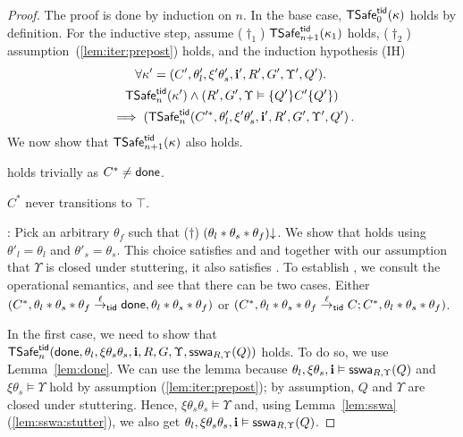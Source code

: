\begin{proof}
The proof is done by induction on $n$.
In the base case, $\safe_0(\kappa)$ holds by definition.
For the inductive step, 
assume 
($\dagger_1$) $\safe_{n+1}(\kappa_1)$ holds, ($\dagger_2$) assumption~(\ref{lem:iter:prepost}) holds, 
and the induction hypothesis (IH)  
\begin{multline*}
  \forall \kappa'=(C',\theta'_l,\xi'\theta'_s,\intp',R',G',\Upsilon', Q').\,
  \mbox{}\\
    \safe_n(\kappa') \land
  (R',G',\Upsilon \vDash \{Q'\} C' \{ Q' \} )\\ \mbox{}
  \implies 
  (\safe_n(C'^*,\theta'_l,\xi'\theta'_s,\intp',R',G',\Upsilon', Q')\,.
\end{multline*}
We now show that $\safe_{n+1}(\kappa)$ also holds.



 holds trivially as $C^* \neq\done$.

$C^*$ never transitions to $\top$.

: 
Pick an arbitrary $\theta_f$ such that ($\dagger$) $\consistent{\theta_l*\theta_s*\theta_f}$.
We show that  holds using
$\theta'_l=\theta_l$ and 
 $\theta'_s = \theta_s$.
This choice satisfies  and  and together with our assumption that
$\Upsilon$ is closed under stuttering, it also satisfies  .
To establish ,
we consult the operational semantics, 
and see that there can be two cases.
Either
$(C^*, \theta_l*\theta_s*\theta_f \stackrel{\ell}{\rightarrow}_{\ltid} \done,\theta_l*\theta_s*\theta_f)$
or 
$(C^*, \theta_l*\theta_s*\theta_f \stackrel{\ell}{\rightarrow}_{\ltid} C;C^*,\theta_l*\theta_s*\theta_f)$.

In the first case, we need to show that 
$\safe_n(\done,\theta_l,\xi\theta_s\theta_s,\intp,R,G,\Upsilon, \sswa{Q}{R}{\Upsilon})$ holds.
To do so, we 
use Lemma~\ref{lem:done}.
We can use the lemma because 
$\theta_l,\xi\theta_s,\intp \vDash  \sswa{Q}{R}{\Upsilon}$ and $\xi\theta_s \vDash \Upsilon$ hold
by assumption (\ref{lem:iter:prepost});
by assumption, $Q$ and $\Upsilon$ are closed under stuttering.
Hence,
$\xi\theta_s\theta_s \vDash \Upsilon$ and, using Lemma~\ref{lem:sswa}(\ref{lem:sswa:stutter}), we also get
$\theta_l,\xi\theta_s\theta_s,\intp \vDash \sswa{Q}{R}{\Upsilon}$.




\end{proof}
